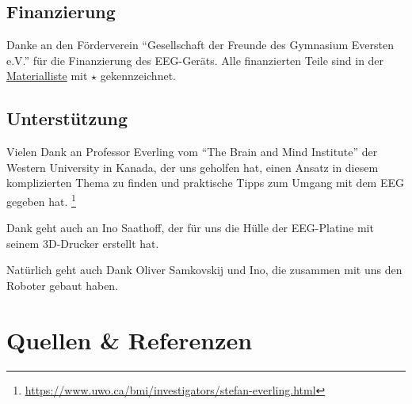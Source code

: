 \documentclass[10pt]{scrartcl}
\begin{document}
	\subsection{Finanzierung} \label{Foerderverein}

	Danke an den Förderverein \enquote{Gesellschaft der Freunde des Gymnasium Eversten e.V.} für die Finanzierung des EEG-Geräts. Alle finanzierten Teile sind in der \hyperref[Materialien]{Materialliste} mit $\star$ gekennzeichnet. 

	\subsection{Unterstützung}

	Vielen Dank an Professor Everling vom \enquote{The Brain and Mind Institute} der Western University in Kanada, der uns geholfen hat, einen Ansatz in diesem komplizierten Thema zu finden und praktische Tipps zum Umgang mit dem EEG gegeben hat. \footnote{\href{https://www.uwo.ca/bmi/investigators/stefan-everling.html}{https://www.uwo.ca/bmi/investigators/stefan-everling.html}}

	Dank geht auch an Ino Saathoff, der für uns die Hülle der EEG-Platine mit seinem 3D-Drucker erstellt hat.

	Natürlich geht auch Dank Oliver Samkovskij und Ino, die zusammen mit uns den Roboter gebaut haben.

	\section{Quellen \& Referenzen}

	\printbibliography[title={Literatur}, keyword={Literatur}, notkeyword={YTVideos}]

	\printbibliography[title={Videos}, keyword={YTVideos}]

	\printbibliography[title=Programme, keyword=Programme]
\end{document}
